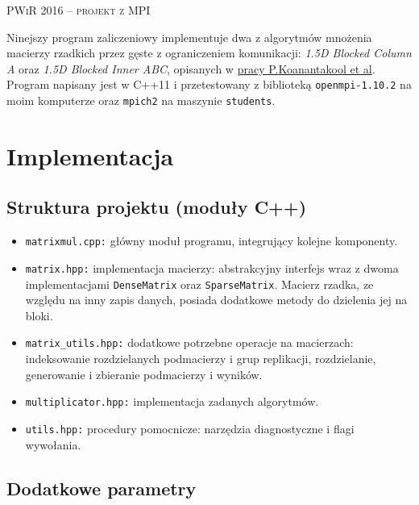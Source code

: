 \documentclass[a4paper,12pt,oneside]{article}
\begin{document}
\pagestyle{fancy}
\lfoot{}
\rfoot{\LaTeX}
\cfoot{\thepage/\pageref{LastPage}}
\begin{center}
	\LARGE{\textsc{PWiR 2016 -- projekt z MPI}}\\\normalsize{}
\end{center}
\vspace{2em}

Ninejszy program zaliczeniowy implementuje dwa z algorytmów mnożenia macierzy rzadkich przez gęste
z ograniczeniem komunikacji: \emph{1.5D Blocked Column A} oraz \emph{1.5D Blocked Inner ABC}, opisanych
w \href{http://www.eecs.berkeley.edu/~penpornk/spdm3\_ipdps16.pdf}{pracy P.Koanantakool et al}.
Program napisany jest w C++11 i przetestowany z biblioteką {\tt openmpi-1.10.2} na moim komputerze
oraz {\tt mpich2} na maszynie {\tt students}.

\section{Implementacja}

\subsection{Struktura projektu (moduły C++)}

\begin{itemize}
    \item {\tt matrixmul.cpp:} główny moduł programu, integrujący kolejne komponenty.
    \item {\tt matrix.hpp:} implementacja macierzy: abstrakcyjny interfejs wraz z dwoma implementacjami
        {\tt DenseMatrix} oraz {\tt SparseMatrix}. Macierz rzadka, ze względu na inny zapis danych,
        posiada dodatkowe metody do dzielenia jej na bloki.
    \item {\tt matrix\_utils.hpp:} dodatkowe potrzebne operacje na macierzach: indeksowanie
        rozdzielanych podmacierzy i grup replikacji, rozdzielanie, generowanie i zbieranie podmacierzy i wyników.
    \item {\tt multiplicator.hpp:} implementacja zadanych algorytmów.
    \item {\tt utils.hpp:} procedury pomocnicze: narzędzia diagnostyczne i flagi wywołania.
\end{itemize}

\subsection{Dodatkowe parametry}
\end{document}
